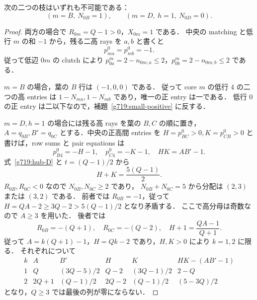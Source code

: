 \begin{lemma}
\label{g719:positive-branches}
次の二つの枝はいずれも不可能である：
\[
 (m=B,\ N_{0B}=1),\qquad
 (m=D,\ h=1,\ N_{0D}=0).
\]
\end{lemma}
\begin{proof}
両方の場合で $R_{0m}=Q-1>0$，$X_{0m}=1$ である．
中央の matching と低行 $m$ の和 $-1$ から，残る二高 rays を $a,b$ と書くと
\[
 p^0_{ma}=p^0_{mb}=-1.
\]
従って低辺 $0m$ の clutch により
$p^m_{0a}=2-n_{0m;a}\le2$，$p^m_{0b}=2-n_{0m;b}\le2$ である．

$m=B$ の場合，葉の $B$ 行は $(-1,0,0)$ である．
従って core $m$ の低行 $4$ の二つの高 entries は
$1-N_{ma},1-N_{mb}$ であり，唯一の正 entry は一である．
低行 $0$ の正 entry は二以下なので，補題~\ref{g719:small-positive} に反する．

$m=D,h=1$ の場合には残る高 rays を葉の $B,C$ の順に置き，
$A=q_{0B},B'=q_{0C}$ とする．中央の正高間 entries を
$H=p^0_{BC}>0,K=p^0_{CB}>0$ と書けば，row sums と pair equations は
\[
 p^0_{B4}=-H-1,\quad p^0_{C4}=-K-1,\quad HK=AB'-1.
\]
式~\eqref{g719:hub-D} と $t=(Q-1)/2$ から
\[
 H+K=\frac{5(Q-1)}2.
\]
$R_{0B},R_{0C}<0$ なので $N_{0B},N_{0C}\ge2$ であり，
$N_{0B}+N_{0C}=5$ から分配は $(2,3)$ または $(3,2)$ である．
前者では $R_{0B}=-1$，従って $H=QA-2\ge3Q-2>5(Q-1)/2$ となり矛盾する．
ここで高分母は奇数なので $A\ge3$ を用いた．
後者では
\[
 R_{0B}=-(Q+1),\quad R_{0C}=-(Q-2),\quad
 H+1=\frac{QA-1}{Q+1}.
\]
従って $A=k(Q+1)-1$，$H=Qk-2$ であり，$H,K>0$ により $k=1,2$ に限る．
それぞれについて
\[
\begin{array}{c|cccc|c}
 k&A&B'&H&K&HK-(AB'-1)\\\hline
 1&Q&(3Q-5)/2&Q-2&(3Q-1)/2&2-Q\\
 2&2Q+1&(Q-1)/2&2Q-2&(Q-1)/2&(5-3Q)/2
\end{array}
\]
となり，$Q\ge3$ では最後の列が零にならない．
\end{proof}

